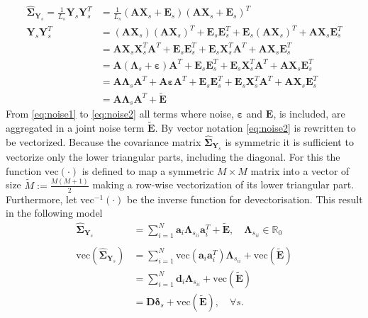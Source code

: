 \begin{align} 
\widehat{\boldsymbol{\Sigma}}_{\mathbf{Y}_s} = \frac{1}{L_s}\mathbf{Y}_s \mathbf{Y}_s^T &= \frac{1}{L_s} \left( \mathbf{A} \mathbf{X}_s + \mathbf{E}_s \right) \left( \mathbf{A} \mathbf{X}_s + \mathbf{E}_s\right)^T \nonumber \\ 
\mathbf{Y}_s \mathbf{Y}_s^T &= (\textbf{AX}_s)(\textbf{AX}_s)^T + \textbf{E}_s \textbf{E}_s^T + \textbf{E}_s (\textbf{AX}_s)^T + \textbf{AX}_s \textbf{E}_s^T \nonumber \\
&= \textbf{AX}_s \textbf{X}_s^T \textbf{A}^T + \textbf{E}_s \textbf{E}_s^T + \textbf{E}_s \textbf{X}_s^T \textbf{A}^T + \textbf{AX}_s \textbf{E}_s^T \nonumber \\
&= \textbf{A}(\boldsymbol{\Lambda}_s +\boldsymbol{\varepsilon}) \textbf{A}^T + \textbf{E}_s \textbf{E}_s^T + \textbf{E}_s \textbf{X}_s^T \textbf{A}^T + \textbf{AX}_s \textbf{E}_s^T \nonumber \\
&= \textbf{A} \boldsymbol{\Lambda}_s \textbf{A}^T + \textbf{A} \boldsymbol{\varepsilon} \textbf{A}^T + \textbf{E}_s \textbf{E}_s^T + \textbf{E}_s \textbf{X}_s^T \textbf{A}^T + \textbf{AX}_s \textbf{E}_s^T \label{eq:noise1} \\
&= \textbf{A} \boldsymbol{\Lambda}_s \textbf{A}^T + \widetilde{\textbf{E}} \label{eq:noise2}
\end{align}
From \eqref{eq:noise1} to \eqref{eq:noise2} all terms where noise, $\boldsymbol{\varepsilon}$ and $\mathbf{E}$, is included, are aggregated in a joint noise term $\widetilde{\textbf{E}}$. 
By vector notation \eqref{eq:noise2} is rewritten to be vectorized. 
Because the covariance matrix $\widehat{\boldsymbol{\Sigma}}_{\mathbf{Y}_s}$ is symmetric it is sufficient to vectorize only the lower triangular parts, including the diagonal. 
For this the function $\text{vec}(\cdot)$ is defined to map a symmetric $M \times M$ matrix into a vector of size $\widetilde{M} := \frac{M(M+1)}{2}$ making a row-wise vectorization of its lower triangular part. 
Furthermore, let vec$^{-1}(\cdot)$ be the inverse function for devectorisation. 
This result in the following model 
\begin{align}
\widehat{\boldsymbol{\Sigma}}_{\mathbf{Y}_s} &= \sum_{i=1}^{N} \textbf{a}_i \boldsymbol{\Lambda}_{s_{ii}} \textbf{a}_i^{T} + \widetilde{\textbf{E}}, \quad \boldsymbol{\Lambda}_{s_{ii}} \in \mathbb{R}_0 \nonumber \\
& \nonumber \\
\text{vec}(\widehat{\boldsymbol{\Sigma}}_{\mathbf{Y}_s}) &= \sum_{i=1}^N \text{vec}(\mathbf{a}_i \mathbf{a}_i^T) \boldsymbol{\Lambda}_{s_{ii}} + \text{vec}( \widetilde{\textbf{E}}) \nonumber \\
&= \sum_{i=1}^N \mathbf{d}_i \boldsymbol{\Lambda}_{s_{ii}} + \text{vec}( \widetilde{\textbf{E}}) \nonumber \nonumber \\
&= \mathbf{D} \boldsymbol{\delta}_s + \text{vec}( \widetilde{\textbf{E}}), \quad \forall s. \label{eq:cov1}
\end{align}
